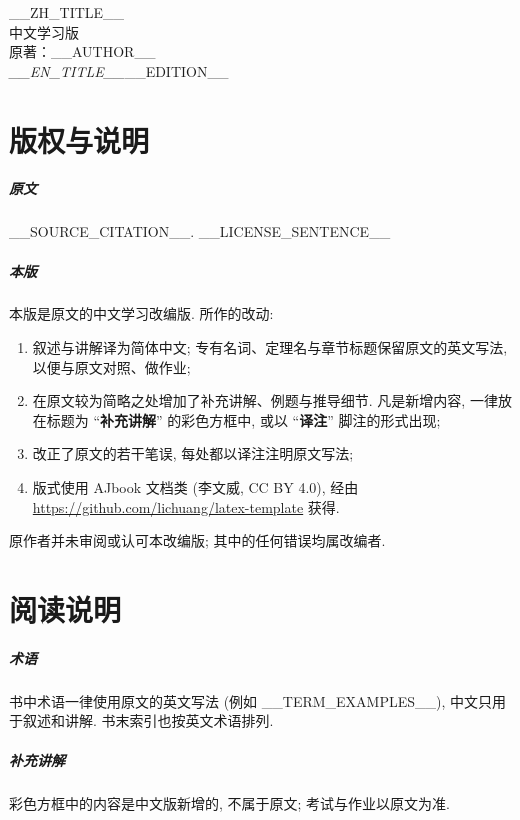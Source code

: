 \thispagestyle{empty}
\begin{center}
	\vspace*{3cm}
	{\Huge\heiti __ZH_TITLE__}\\[1.2em]
	{\Large 中文学习版}\\[3em]
	{\large 原著：__AUTHOR__}\\[0.5em]
	{\normalsize \emph{__EN_TITLE__}__EDITION__}\\[\fill]
\end{center}
\clearpage

\chapter*{版权与说明}

\paragraph*{原文} __SOURCE_CITATION__. __LICENSE_SENTENCE__

\paragraph*{本版} 本版是原文的中文学习改编版. 所作的改动:
\begin{enumerate}
	\item 叙述与讲解译为简体中文; 专有名词、定理名与章节标题保留原文的英文写法, 以便与原文对照、做作业;
	\item 在原文较为简略之处增加了补充讲解、例题与推导细节. 凡是新增内容, 一律放在标题为 “\textbf{补充讲解}” 的彩色方框中, 或以 “\textbf{译注}” 脚注的形式出现;
	\item 改正了原文的若干笔误, 每处都以译注注明原文写法;
	\item 版式使用 AJbook 文档类 (李文威, CC BY 4.0), 经由 \url{https://github.com/lichuang/latex-template} 获得.
\end{enumerate}
原作者并未审阅或认可本改编版; 其中的任何错误均属改编者.

\chapter*{阅读说明}
\paragraph*{术语} 书中术语一律使用原文的英文写法 (例如 __TERM_EXAMPLES__), 中文只用于叙述和讲解. 书末索引也按英文术语排列.
\paragraph*{补充讲解} 彩色方框中的内容是中文版新增的, 不属于原文; 考试与作业以原文为准.
